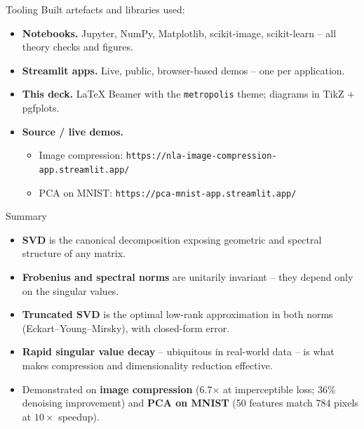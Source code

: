\documentclass[10pt,aspectratio=169]{beamer}
\begin{document}
\begin{frame}{Tooling}
  Built artefacts and libraries used:
  \begin{itemize}
    \item \textbf{Notebooks.} Jupyter, NumPy, Matplotlib, scikit-image, scikit-learn -- all theory checks and figures.
    \item \textbf{Streamlit apps.} Live, public, browser-based demos -- one per application.
    \item \textbf{This deck.} \LaTeX{} Beamer with the \texttt{metropolis} theme; diagrams in TikZ + pgfplots.
    \item \textbf{Source / live demos.}
      \begin{itemize}
        \item Image compression: \texttt{https://nla-image-compression-app.streamlit.app/}
        \item PCA on MNIST: \texttt{https://pca-mnist-app.streamlit.app/}
      \end{itemize}
  \end{itemize}
\end{frame}

\begin{frame}{Summary}
  \begin{itemize}
    \item \textbf{SVD} is the canonical decomposition exposing geometric and spectral structure of any matrix.
    \item \textbf{Frobenius and spectral norms} are unitarily invariant -- they depend only on the singular values.
    \item \textbf{Truncated SVD} is the optimal low-rank approximation in both norms (Eckart--Young--Mirsky), with closed-form error.
    \item \textbf{Rapid singular value decay} -- ubiquitous in real-world data -- is what makes compression and dimensionality reduction effective.
    \item Demonstrated on \textbf{image compression} (6.7$\times$ at imperceptible loss; 36\% denoising improvement) and \textbf{PCA on MNIST} (50 features match 784 pixels at $10\times$ speedup).
  \end{itemize}
\end{frame}
\end{document}
